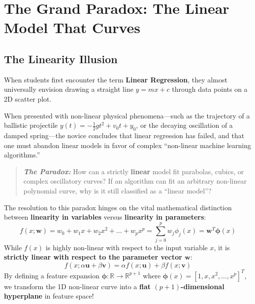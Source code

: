 \section{The Grand Paradox: The Linear Model That Curves}

\subsection{The Linearity Illusion}
When students first encounter the term \textbf{Linear Regression}, they almost universally envision drawing a straight line $y = mx + c$ through data points on a 2D scatter plot. 

When presented with non-linear physical phenomena—such as the trajectory of a ballistic projectile $y(t) = -\frac{1}{2}gt^2 + v_0 t + y_0$, or the decaying oscillation of a damped spring—the novice concludes that linear regression has failed, and that one must abandon linear models in favor of complex ``non-linear machine learning algorithms.''

\begin{quote}
\textit{\textbf{The Paradox:}} How can a strictly \textbf{linear} model fit parabolas, cubics, or complex oscillatory curves? If an algorithm can fit an arbitrary non-linear polynomial curve, why is it still classified as a ``linear model''?
\end{quote}

The resolution to this paradox hinges on the vital mathematical distinction between \textbf{linearity in variables} versus \textbf{linearity in parameters}:
\begin{equation}
f(x; \mathbf{w}) = w_0 + w_1 x + w_2 x^2 + \dots + w_p x^p = \sum_{j=0}^p w_j \phi_j(x) = \mathbf{w}^T \boldsymbol{\phi}(x)
\end{equation}
While $f(x)$ is highly non-linear with respect to the input variable $x$, it is \textbf{strictly linear with respect to the parameter vector $\mathbf{w}$}:
\begin{equation}
f(x; \alpha \mathbf{u} + \beta \mathbf{v}) = \alpha f(x; \mathbf{u}) + \beta f(x; \mathbf{v})
\end{equation}
By defining a feature expansion $\boldsymbol{\phi}: \mathbb{R} \to \mathbb{R}^{p+1}$ where $\boldsymbol{\phi}(x) = [1, x, x^2, \dots, x^p]^T$, we transform the 1D non-linear curve into a \textbf{flat $(p+1)$-dimensional hyperplane} in feature space! 

